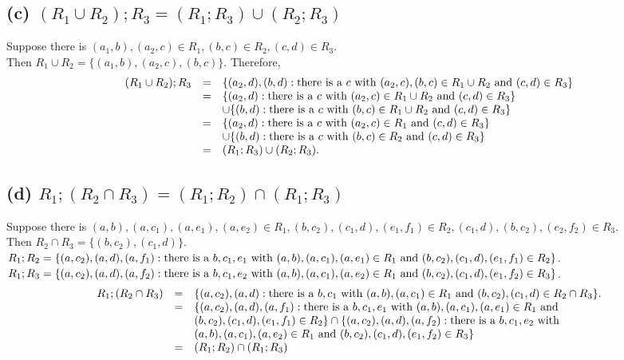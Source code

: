 \documentclass[]{article}
\begin{document}
\begin{spacing}{1.5}
\subsection*{(c) $ (R_1 \cup R_2) ; R_3 = (R_1; R_3) \cup (R_2; R_3)$}
Suppose there is $ (a_1, b), (a_2, c) \in R_1, (b, c) \in R_2, (c, d) \in R_3 $.\\
Then $ R_1 \cup R_2 = \{(a_1, b), (a_2, c), (b, c)\} $. Therefore,
\[\begin{array}{rcl}
	(R_1 \cup R_2); R_3 &=& \{(a_2, d), (b, d) : \text{there is a $ c $ with } (a_2, c), (b, c) \in R_1 \cup R_2 \text{ and } (c, d) \in R_3\}\\
	&=& \{(a_2, d) : \text{there is a $ c $ with } (a_2, c) \in R_1 \cup R_2 \text{ and } (c, d) \in R_3\} \\
	&&\cup \{(b, d) : \text{there is a $ c $ with } (b, c) \in R_1 \cup R_2 \text{ and } (c, d) \in R_3\}\\
	&=& \{(a_2, d) : \text{there is a $ c $ with } (a_2, c) \in R_1  \text{ and } (c, d) \in R_3\} \\
	&&\cup \{(b, d) : \text{there is a $ c $ with } (b, c) \in R_2 \text{ and } (c, d) \in R_3\}\\
	&=& (R_1; R_3) \cup (R_2; R_3).
\end{array}\]

\subsection*{(d) $ R_1; (R_2 \cap R_3) = (R_1; R_2) \cap (R_1; R_3)$}
Suppose there is $ (a, b), (a, c_1), (a, e_1), (a, e_2) \in R_1, (b, c_2),  (c_1, d), (e_1, f_1) \in R_2, (c_1, d),  (b, c_2), (e_2, f_2) \in R_3 $.\\
Then $ R_2 \cap R_3 = \{(b, c_2), (c_1, d)\}.$\\
$ R_1; R_2 = \{(a, c_2), (a, d), (a, f_1) : \text{there is a $ b, c_1, e_1  $ with } (a, b), (a, c_1), (a, e_1) \in R_1 \text{ and } (b, c_2), (c_1, d), (e_1, f_1) \in R_2\} $.\\
$ R_1; R_3 = \{(a, c_2), (a, d), (a, f_2) : \text{there is a $ b, c_1, e_2  $ with } (a, b), (a, c_1), (a, e_2) \in R_1 \text{ and } (b, c_2), (c_1, d), (e_1, f_2) \in R_3\} $.\\

\[
\begin{array}{rcl}
	 R_1; (R_2 \cap R_3) &=& \{(a, c_2), (a, d) : \text{there is a $ b, c_1 $ with } (a, b), (a, c_1) \in R_1 \text{ and } (b, c_2), (c_1, d) \in R_2 \cap R_3\} .\\
	 &=& \{(a, c_2), (a, d), (a, f_1) : \text{there is a $ b, c_1, e_1 $ with } (a, b), (a, c_1), (a, e_1) \in R_1 \text{ and } \\
	 &&(b, c_2), (c_1, d), (e_1, f_1) \in R_2 \}  \cap  \{(a, c_2), (a, d), (a, f_2) : \text{there is a $ b, c_1, e_2  $ with } \\
	 &&(a, b), (a, c_1), (a, e_2) \in R_1 \text{ and } (b, c_2), (c_1, d), (e_1, f_2) \in R_3\} \\
	 &=& (R_1; R_2) \cap (R_1; R_3)
\end{array}
\]



\end{spacing}
\end{document}
